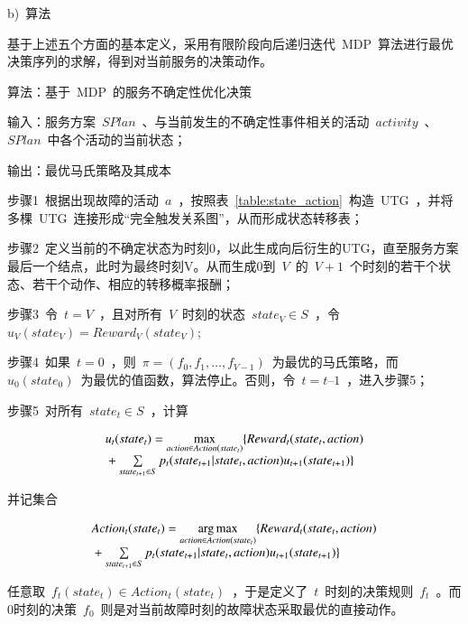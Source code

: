 b)~{算法}

基于上述五个方面的基本定义，采用有限阶段向后递归迭代~MDP~算法进行最优决策序列的求解，得到对当前服务的决策动作。

算法：基于~MDP~的服务不确定性优化决策

输入：服务方案~$SPlan$~、与当前发生的不确定性事件相关的活动~$activity$~、
~$SPlan$~中各个活动的当前状态；

输出：最优马氏策略及其成本

步骤1~根据出现故障的活动~$a$~，按照表~\ref{table:state_action}~构造~UTG~，并将多棵~UTG~连接形成“完全触发关系图”，从而形成状态转移表；

步骤2~定义当前的不确定状态为时刻0，以此生成向后衍生的UTG，直至服务方案最后一个结点，此时为最终时刻V。从而生成0到~$V$~的~$V+1$~个时刻的若干个状态、若干个动作、相应的转移概率报酬；

步骤3~令~$t=V$~，且对所有~$V$~时刻的状态~$state_V \in S$~，令~${u_V}( {state_V} ) = Reward_V( {state_V} )$;

步骤4~如果~$t=0$~，则~$\pi  = (f_0,f_1,\ldots ,f_{V-1})$~为最优的马氏策略，而~${u_0}( state_0)$~为最优的值函数，算法停止。否则，令~$t=t–1$~，进入步骤5；

步骤5~对所有~$state_t \in S$~，计算

\begin{equation}\label{equation:backward_mdp}
\begin{array}{l}
{u_t}(stat{e_t}) = \mathop {\max }\limits_{action \in Action(stat{e_t})} \{ Rewar{d_t}(stat{e_t},action)\\
{\rm{                        }} + \sum\limits_{stat{e_{t + 1}} \in S} {{p_t}(stat{e_{t + 1}}|stat{e_t},action){u_{t + 1}}(stat{e_{t + 1}})} \} 
\end{array}
\end{equation}

并记集合

\begin{equation}\label{equation:backward_mdp_arg}
\begin{array}{l}
Actio{n_t}(stat{e_t}) = \mathop {\arg \max }\limits_{action \in Action(stat{e_t})} \{ Rewar{d_t}(stat{e_t},action)\\
{\rm{                       }} + \sum\limits_{stat{e_{t + 1}} \in S} {{p_t}(stat{e_{t + 1}}|stat{e_t},action){u_{t + 1}}(stat{e_{t + 1}})} \} 
\end{array}
\end{equation}

任意取~$f_t(state_t) \in Action_t(state_t)$~，于是定义了~$t$~时刻的决策规则~$f_t$~。而0时刻的决策~$f_0$~则是对当前故障时刻的故障状态采取最优的直接动作。

